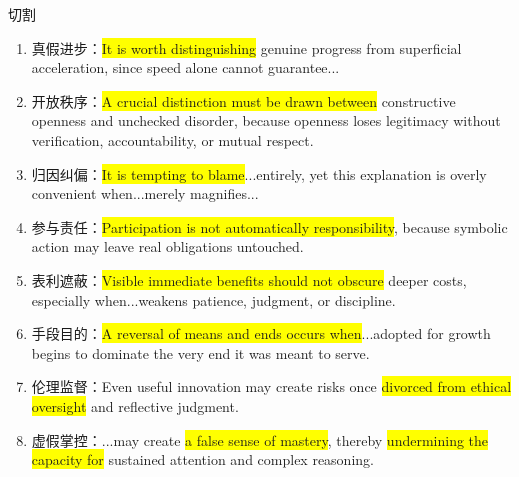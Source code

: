 ﻿\documentclass[lang=cn,11pt]{elegantbook}
\begin{document}
切割
\begin{enumerate}
    \item 真假进步：\colorbox{yellow}{It is worth distinguishing} genuine progress from superficial acceleration, since speed alone cannot guarantee...
    \item 开放秩序：\colorbox{yellow}{A crucial distinction must be drawn between} constructive openness and unchecked disorder, because openness loses legitimacy without verification, accountability, or mutual respect.
    \item 归因纠偏：\colorbox{yellow}{It is tempting to blame}...entirely, yet this explanation is overly convenient when...merely magnifies...
    \item 参与责任：\colorbox{yellow}{Participation is not automatically responsibility}, because symbolic action may leave real obligations untouched.
    \item 表利遮蔽：\colorbox{yellow}{Visible immediate benefits should not obscure} deeper costs, especially when...weakens patience, judgment, or discipline.
    \item 手段目的：\colorbox{yellow}{A reversal of means and ends occurs when}...adopted for growth begins to dominate the very end it was meant to serve.
    \item 伦理监督：Even useful innovation may create risks once \colorbox{yellow}{divorced from ethical oversight} and reflective judgment.
    \item 虚假掌控：...may create \colorbox{yellow}{a false sense of mastery}, thereby \colorbox{yellow}{undermining the capacity for} sustained attention and complex reasoning.
\end{enumerate}
\end{document}
